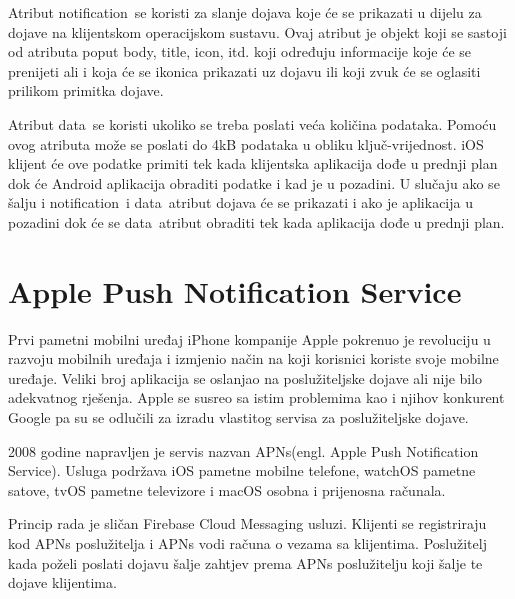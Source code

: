 \documentclass[times, utf8, zavrsni]{fer}
\begin{document}
Atribut \glqq notification\grqq\  se koristi za slanje dojava koje će se prikazati u dijelu za dojave na klijentskom operacijskom sustavu. Ovaj atribut je objekt koji se sastoji od atributa poput \glqq body\grqq , \glqq title\grqq , \glqq icon\grqq , itd. koji određuju informacije koje će se prenijeti ali i koja će se ikonica prikazati uz dojavu ili koji zvuk će se oglasiti prilikom primitka dojave.

Atribut \glqq data\grqq\  se koristi ukoliko se treba poslati veća količina podataka. Pomoću ovog atributa može se poslati do 4kB podataka u obliku ključ-vrijednost. iOS klijent će ove podatke primiti tek kada klijentska aplikacija dođe u prednji plan dok će Android aplikacija obraditi podatke i kad je u pozadini. U slučaju ako se šalju i \glqq notification\grqq\  i \glqq data\grqq\  atribut dojava će se prikazati i ako je aplikacija u pozadini dok će se \glqq data\grqq\  atribut obraditi tek kada aplikacija dođe u prednji plan.\citep{fcm2017}

\section{Apple Push Notification Service}

Prvi pametni mobilni uređaj iPhone kompanije Apple pokrenuo je revoluciju u razvoju mobilnih uređaja i izmjenio način na koji korisnici koriste svoje mobilne uređaje. Veliki broj aplikacija se oslanjao na poslužiteljske dojave ali nije bilo adekvatnog rješenja. Apple se susreo sa istim problemima kao i njihov konkurent Google pa su se odlučili za izradu vlastitog servisa za poslužiteljske dojave.

2008 godine napravljen je servis nazvan APNs(engl. Apple Push Notification Service). Usluga podržava iOS pametne mobilne telefone, watchOS pametne satove, tvOS pametne televizore i macOS osobna i prijenosna računala.

Princip rada je sličan Firebase Cloud Messaging usluzi. Klijenti se registriraju kod APNs poslužitelja i APNs vodi računa o vezama sa klijentima. Poslužitelj kada poželi poslati dojavu šalje zahtjev prema APNs poslužitelju koji šalje te dojave klijentima.
\end{document}
